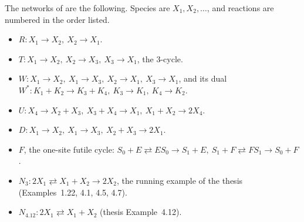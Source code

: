 \documentclass[11pt,a4paper]{report}
\begin{document}
The networks of  are the following. Species are \(X_1,X_2,\dots\), and reactions are numbered
in the order listed.
\begin{itemize}
\item \(R\colon X_1\to X_2,\ X_2\to X_1\).
\item \(T\colon X_1\to X_2,\ X_2\to X_3,\ X_3\to X_1\), the 3-cycle.
\item \(W\colon X_1\to X_2,\ X_1\to X_3,\ X_2\to X_1,\ X_3\to X_1\), and its dual
\(W^*\colon K_1+K_2\to K_3+K_4,\ K_3\to K_1,\ K_4\to K_2\).
\item \(U\colon X_4\to X_2+X_3,\ X_3+X_4\to X_1,\ X_1+X_2\to2X_4\).
\item \(D\colon X_1\to X_2,\ X_1\to X_3,\ X_2+X_3\to2X_1\).
\item \(F\), the one-site futile cycle:
\(S_0+E\rightleftarrows ES_0\to S_1+E,\ S_1+F\rightleftarrows FS_1\to S_0+F\).
\item \(N_3\colon 2X_1\rightleftarrows X_1+X_2\to 2X_2\), the running example of the thesis~\autocite{Iosif2019}
(Examples~1.22, 4.1, 4.5, 4.7).
\item \(N_{4.12}\colon 2X_1\rightleftarrows X_1+X_2\) (thesis Example~4.12).
\end{itemize}
\end{document}
